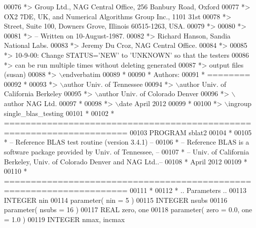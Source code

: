 \begin{DoxyCode}
00076 \textcolor{comment}{*>       Group  Ltd.,  NAG  Central  Office,  256  Banbury  Road, Oxford}
00077 \textcolor{comment}{*>       OX2 7DE, UK,  and  Numerical Algorithms Group Inc.,  1101  31st}
00078 \textcolor{comment}{*>       Street,  Suite 100,  Downers Grove,  Illinois 60515-1263,  USA.}
00079 \textcolor{comment}{*>}
00080 \textcolor{comment}{*>}
00081 \textcolor{comment}{*> -- Written on 10-August-1987.}
00082 \textcolor{comment}{*>    Richard Hanson, Sandia National Labs.}
00083 \textcolor{comment}{*>    Jeremy Du Croz, NAG Central Office.}
00084 \textcolor{comment}{*>}
00085 \textcolor{comment}{*>    10-9-00:  Change STATUS='NEW' to 'UNKNOWN' so that the testers}
00086 \textcolor{comment}{*>              can be run multiple times without deleting generated}
00087 \textcolor{comment}{*>              output files (susan)}
00088 \textcolor{comment}{*> \(\backslash\)endverbatim}
00089 \textcolor{comment}{*}
00090 \textcolor{comment}{*  Authors:}
00091 \textcolor{comment}{*  ========}
00092 \textcolor{comment}{*}
00093 \textcolor{comment}{*> \(\backslash\)author Univ. of Tennessee }
00094 \textcolor{comment}{*> \(\backslash\)author Univ. of California Berkeley }
00095 \textcolor{comment}{*> \(\backslash\)author Univ. of Colorado Denver }
00096 \textcolor{comment}{*> \(\backslash\)author NAG Ltd. }
00097 \textcolor{comment}{*}
00098 \textcolor{comment}{*> \(\backslash\)date April 2012}
00099 \textcolor{comment}{*}
00100 \textcolor{comment}{*> \(\backslash\)ingroup single\_blas\_testing}
00101 \textcolor{comment}{*}
00102 \textcolor{comment}{*  =====================================================================}
00103       \textcolor{keyword}{PROGRAM} sblat2
00104 \textcolor{comment}{*}
00105 \textcolor{comment}{*  -- Reference BLAS test routine (version 3.4.1) --}
00106 \textcolor{comment}{*  -- Reference BLAS is a software package provided by Univ. of Tennessee,    --}
00107 \textcolor{comment}{*  -- Univ. of California Berkeley, Univ. of Colorado Denver and NAG Ltd..--}
00108 \textcolor{comment}{*     April 2012}
00109 \textcolor{comment}{*}
00110 \textcolor{comment}{*  =====================================================================}
00111 \textcolor{comment}{*}
00112 \textcolor{comment}{*     .. Parameters ..}
00113       \textcolor{keywordtype}{INTEGER}            nin
00114       parameter( nin = 5 )
00115       \textcolor{keywordtype}{INTEGER}            nsubs
00116       parameter( nsubs = 16 )
00117       \textcolor{keywordtype}{REAL}               zero, one
00118       parameter( zero = 0.0, one = 1.0 )
00119       \textcolor{keywordtype}{INTEGER}            nmax, incmax

\end{DoxyCode}
